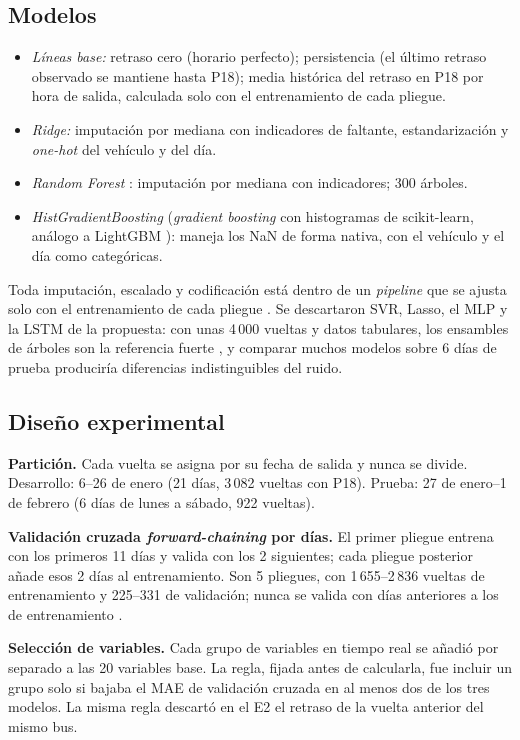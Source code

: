 \documentclass[conference,spanish]{IEEEtran}
\begin{document}
\subsection{Modelos}
\begin{itemize}
    \item \emph{Líneas base:} retraso cero (horario perfecto); persistencia (el último retraso observado se mantiene hasta P18); media histórica del retraso en P18 por hora de salida, calculada solo con el entrenamiento de cada pliegue.
    \item \emph{Ridge:} imputación por mediana con indicadores de faltante, estandarización y \textit{one-hot} del vehículo y del día.
    \item \emph{Random Forest} \cite{breiman2001}: imputación por mediana con indicadores; 300 árboles.
    \item \emph{HistGradientBoosting} (\textit{gradient boosting} con histogramas de scikit-learn, análogo a LightGBM \cite{ke2017}): maneja los NaN de forma nativa, con el vehículo y el día como categóricas.
\end{itemize}
Toda imputación, escalado y codificación está dentro de un \textit{pipeline} que se ajusta solo con el entrenamiento de cada pliegue \cite{pedregosa2011,kaufman2012}. Se descartaron SVR, Lasso, el MLP y la LSTM de la propuesta: con unas 4\,000 vueltas y datos tabulares, los ensambles de árboles son la referencia fuerte \cite{grinsztajn2022}, y comparar muchos modelos sobre 6 días de prueba produciría diferencias indistinguibles del ruido.

\subsection{Diseño experimental}
\textbf{Partición.} Cada vuelta se asigna por su fecha de salida y nunca se divide. Desarrollo: 6--26 de enero (21 días, 3\,082 vueltas con P18). Prueba: 27 de enero--1 de febrero (6 días de lunes a sábado, 922 vueltas).

\textbf{Validación cruzada \textit{forward-chaining} por días.} El primer pliegue entrena con los primeros 11 días y valida con los 2 siguientes; cada pliegue posterior añade esos 2 días al entrenamiento. Son 5 pliegues, con 1\,655--2\,836 vueltas de entrenamiento y 225--331 de validación; nunca se valida con días anteriores a los de entrenamiento \cite{bergmeir2012}.

\textbf{Selección de variables.} Cada grupo de variables en tiempo real se añadió por separado a las 20 variables base. La regla, fijada antes de calcularla, fue incluir un grupo solo si bajaba el MAE de validación cruzada en al menos dos de los tres modelos. La misma regla descartó en el E2 el retraso de la vuelta anterior del mismo bus.
\end{document}
